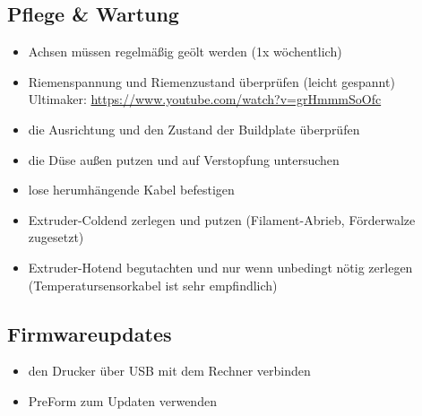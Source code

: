 \documentclass{\basedir/fablab-document}
\begin{document}
	\subsection{Pflege \& Wartung}
	
	\begin{itemize}
		\item Achsen müssen regelmäßig geölt werden (1x wöchentlich)
		\item Riemenspannung und Riemenzustand überprüfen (leicht gespannt)\\
		Ultimaker: \url{https://www.youtube.com/watch?v=grHmmmSoOfc}
		\item die Ausrichtung und den Zustand der Buildplate überprüfen
		\item die Düse außen putzen und auf Verstopfung untersuchen
		\item lose herumhängende Kabel befestigen
		\item Extruder-Coldend zerlegen und putzen (Filament-Abrieb, Förderwalze zugesetzt)
		\item Extruder-Hotend begutachten und nur wenn unbedingt nötig zerlegen (Temperatursensorkabel ist sehr empfindlich)
	\end{itemize}
	
	\subsection{Firmwareupdates}
	
	\begin{itemize}
		\item den Drucker über USB mit dem Rechner verbinden
		\item PreForm zum Updaten verwenden
	\end{itemize}
	
\end{document}
